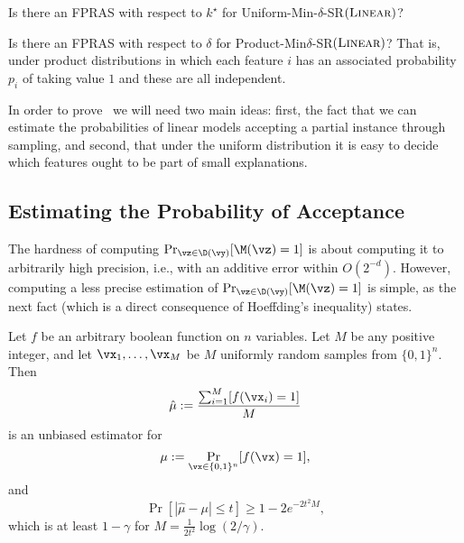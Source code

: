
\begin{open}
    Is there an FPRAS with respect to $k^\star$ for  Uniform-Min-$\delta$-SR$(\textsc{Linear})$?
\end{open}

\begin{open}
    Is there an FPRAS with respect to $\delta$ for Product-Min$\delta$-SR$(\textsc{Linear})$? That is, under product distributions in which each feature $i$ has an associated probability $p_i$ of taking value $1$ and these are all independent.
\end{open}


In order to prove~ we will need two main ideas: first, the fact that we can estimate the probabilities of linear models accepting a partial instance through sampling, and second, that under the uniform distribution it is easy to decide which features ought to be part of small explanations.

\subsection{Estimating the Probability of Acceptance}
 The  hardness of computing
$\Pr_{\vz  \in \D(\vy)}[\M(\vz) = 1]$ is about computing it to arbitrarily high precision, i.e., with an additive error within $O(2^{-d})$. However, computing a less precise estimation of $\Pr_{\vz \in \D(\vy)}[\M(\vz) = 1]$ is simple, as the next fact (which is a direct consequence of Hoeffding's inequality)  states.

\begin{fact}\label{fact:hoeffding}
    Let $f$ be an arbitrary boolean function on $n$ variables. Let $M$ be any positive integer,
    and let $\vx_1, \ldots, \vx_M$ be $M$ uniformly random samples from $\{0, 1\}^n$. Then 
    \[
        \hat{\mu} := \frac{\sum_{i=1}^M [f(\vx_i) = 1]}{M}
    \]
    is an unbiased estimator for 
    \[
        \mu := \Pr_{\vx \in \{0, 1\}^n}[f(\vx) = 1],
    \]
    and 
    \[
    \Pr[\left|\hat{\mu} - \mu \right| \leq t] \geq 1 - 2e^{-2t^2 M},
    \]
    which is at least $1 - \gamma$ for $M = \frac{1}{2t^2} \log(2/\gamma)$.
\end{fact}

